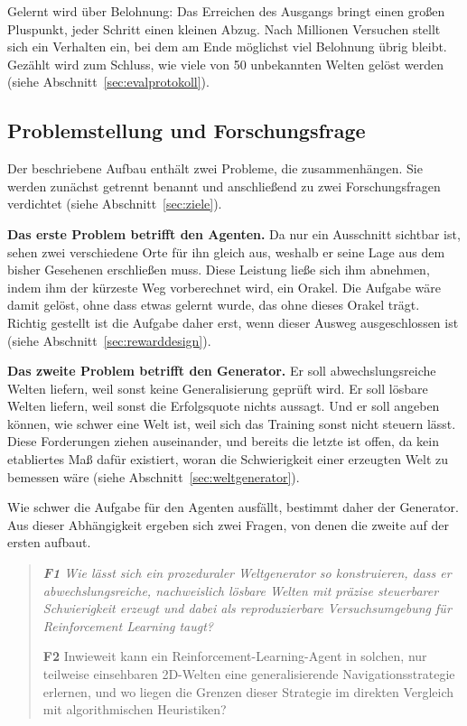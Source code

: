 \documentclass[11pt,a4paper]{article}
\begin{document}
Gelernt wird über Belohnung: Das Erreichen des Ausgangs bringt einen großen
Pluspunkt, jeder Schritt einen kleinen Abzug. Nach Millionen Versuchen stellt
sich ein Verhalten ein, bei dem am Ende möglichst viel Belohnung übrig bleibt.
Gezählt wird zum Schluss, wie viele von 50 unbekannten Welten gelöst werden
(siehe Abschnitt~\ref{sec:evalprotokoll}).

\subsection{Problemstellung und Forschungsfrage}

Der beschriebene Aufbau enthält zwei Probleme, die zusammenhängen. Sie werden
zunächst getrennt benannt und anschließend zu zwei Forschungsfragen verdichtet
(siehe Abschnitt~\ref{sec:ziele}).

\textbf{Das erste Problem betrifft den Agenten.} Da nur ein Ausschnitt sichtbar
ist, sehen zwei verschiedene Orte für ihn gleich aus, weshalb er seine Lage aus
dem bisher Gesehenen erschließen muss. Diese Leistung ließe sich ihm abnehmen,
indem ihm der kürzeste Weg vorberechnet wird, ein \glqq Orakel\grqq. Die
Aufgabe wäre damit gelöst, ohne dass etwas gelernt wurde, das ohne dieses
Orakel trägt. Richtig gestellt ist die Aufgabe daher erst, wenn dieser Ausweg
ausgeschlossen ist (siehe Abschnitt~\ref{sec:rewarddesign}).

\textbf{Das zweite Problem betrifft den Generator.} Er soll abwechslungsreiche
Welten liefern, weil sonst keine Generalisierung geprüft wird. Er soll lösbare
Welten liefern, weil sonst die Erfolgsquote nichts aussagt. Und er soll angeben
können, wie schwer eine Welt ist, weil sich das Training sonst nicht steuern
lässt. Diese Forderungen ziehen auseinander, und bereits die letzte ist offen,
da kein etabliertes Maß dafür existiert, woran die Schwierigkeit einer
erzeugten Welt zu bemessen wäre (siehe Abschnitt~\ref{sec:weltgenerator}).

Wie schwer die Aufgabe für den Agenten ausfällt, bestimmt daher der Generator.
Aus dieser Abhängigkeit ergeben sich zwei Fragen, von denen die zweite auf der
ersten aufbaut.

\begin{quote}
\itshape
\textbf{F1} \quad Wie lässt sich ein prozeduraler Weltgenerator so
konstruieren, dass er abwechslungsreiche, nachweislich lösbare Welten mit
präzise steuerbarer Schwierigkeit erzeugt und dabei als reproduzierbare
Versuchsumgebung für Reinforcement Learning taugt?

\vspace{0.25cm}
\textbf{F2} \quad Inwieweit kann ein Reinforcement-Learning-Agent in
solchen, nur teilweise einsehbaren 2D-Welten eine generalisierende
Navigationsstrategie erlernen, und wo liegen die Grenzen dieser Strategie
im direkten Vergleich mit algorithmischen Heuristiken?
\end{quote}
\label{sec:forschungsfrage}
\end{document}
